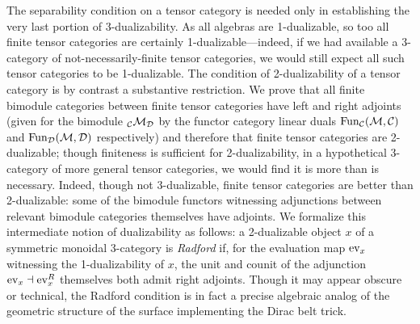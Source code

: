 \documentclass{amsart}
\begin{document}
The separability condition on a tensor category is needed only in establishing the very last portion of 3-dualizability.  As all algebras are 1-dualizable, so too all finite tensor categories are certainly 1-dualizable---indeed, if we had available a 3-category of not-necessarily-finite tensor categories, we would still expect all such tensor categories to be 1-dualizable.  The condition of 2-dualizability of a tensor category is by contrast a substantive restriction.  We prove that all finite bimodule categories between finite tensor categories have left and right adjoints (given for the bimodule ${}_\mathcal C \mathcal M_\mathcal D$ by the functor category linear duals $\operatorname{Fun}_\mathcal C(\mathcal M,\mathcal C)$ and $\operatorname{Fun}_\mathcal D(\mathcal M,\mathcal D)$ respectively) and therefore that finite tensor categories are 2-dualizable; though finiteness is sufficient for 2-dualizability, in a hypothetical 3-category of more general tensor categories, we would find it is more than is necessary.  Indeed, though not 3-dualizable, finite tensor categories are better than 2-dualizable: some of the bimodule functors witnessing adjunctions between relevant bimodule categories themselves have adjoints.  We formalize this intermediate notion of dualizability as follows: a 2-dualizable object $x$ of a symmetric monoidal 3-category is \emph{Radford} if, for the evaluation map $\mathrm{ev}_x$ witnessing the 1-dualizability of $x$, the unit and counit of the adjunction $\mathrm{ev}_x \dashv \mathrm{ev}_x^R$ themselves both admit right adjoints.  Though it may appear obscure or technical, the Radford condition is in fact a precise algebraic analog of the geometric structure of the surface implementing the Dirac belt trick.
\end{document}

